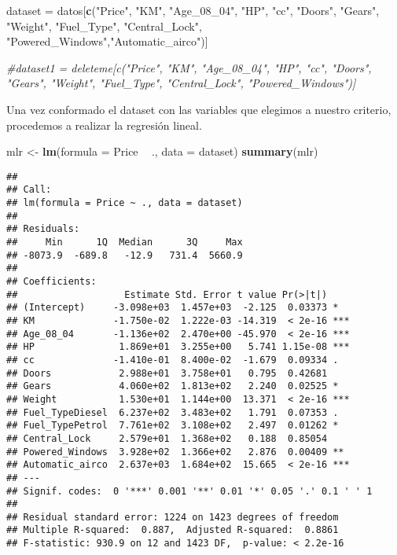\documentclass[
]{article}
\newenvironment{Shaded}{\begin{snugshade}}{\end{snugshade}}
\newcommand{\CommentTok}[1]{\textcolor[rgb]{0.56,0.35,0.01}{\textit{#1}}}
\newcommand{\DataTypeTok}[1]{\textcolor[rgb]{0.13,0.29,0.53}{#1}}
\newcommand{\KeywordTok}[1]{\textcolor[rgb]{0.13,0.29,0.53}{\textbf{#1}}}
\newcommand{\NormalTok}[1]{#1}
\newcommand{\OperatorTok}[1]{\textcolor[rgb]{0.81,0.36,0.00}{\textbf{#1}}}
\newcommand{\StringTok}[1]{\textcolor[rgb]{0.31,0.60,0.02}{#1}}
\begin{document}
\begin{Shaded}
\begin{Highlighting}[]
\NormalTok{dataset =}\StringTok{ }\NormalTok{datos[}\KeywordTok{c}\NormalTok{(}\StringTok{"Price"}\NormalTok{, }\StringTok{"KM"}\NormalTok{, }\StringTok{"Age_08_04"}\NormalTok{, }\StringTok{"HP"}\NormalTok{, }\StringTok{"cc"}\NormalTok{, }\StringTok{"Doors"}\NormalTok{, }\StringTok{"Gears"}\NormalTok{, }\StringTok{"Weight"}\NormalTok{,}
                  \StringTok{"Fuel_Type"}\NormalTok{, }\StringTok{"Central_Lock"}\NormalTok{, }\StringTok{"Powered_Windows"}\NormalTok{,}\StringTok{"Automatic_airco"}\NormalTok{)]}

\CommentTok{#dataset1 = deleteme[c("Price", "KM", "Age_08_04", "HP", "cc", "Doors", "Gears", "Weight", "Fuel_Type", "Central_Lock", "Powered_Windows")]}
\end{Highlighting}
\end{Shaded}

Una vez conformado el dataset con las variables que elegimos a nuestro
criterio, procedemos a realizar la regresión lineal.

\begin{Shaded}
\begin{Highlighting}[]
\NormalTok{mlr <-}\StringTok{ }\KeywordTok{lm}\NormalTok{(}\DataTypeTok{formula =}\NormalTok{ Price }\OperatorTok{~}\StringTok{ }\NormalTok{., }\DataTypeTok{data =}\NormalTok{ dataset)}
\KeywordTok{summary}\NormalTok{(mlr)}
\end{Highlighting}
\end{Shaded}

\begin{verbatim}
## 
## Call:
## lm(formula = Price ~ ., data = dataset)
## 
## Residuals:
##     Min      1Q  Median      3Q     Max 
## -8073.9  -689.8   -12.9   731.4  5660.9 
## 
## Coefficients:
##                   Estimate Std. Error t value Pr(>|t|)    
## (Intercept)     -3.098e+03  1.457e+03  -2.125  0.03373 *  
## KM              -1.750e-02  1.222e-03 -14.319  < 2e-16 ***
## Age_08_04       -1.136e+02  2.470e+00 -45.970  < 2e-16 ***
## HP               1.869e+01  3.255e+00   5.741 1.15e-08 ***
## cc              -1.410e-01  8.400e-02  -1.679  0.09334 .  
## Doors            2.988e+01  3.758e+01   0.795  0.42681    
## Gears            4.060e+02  1.813e+02   2.240  0.02525 *  
## Weight           1.530e+01  1.144e+00  13.371  < 2e-16 ***
## Fuel_TypeDiesel  6.237e+02  3.483e+02   1.791  0.07353 .  
## Fuel_TypePetrol  7.761e+02  3.108e+02   2.497  0.01262 *  
## Central_Lock     2.579e+01  1.368e+02   0.188  0.85054    
## Powered_Windows  3.928e+02  1.366e+02   2.876  0.00409 ** 
## Automatic_airco  2.637e+03  1.684e+02  15.665  < 2e-16 ***
## ---
## Signif. codes:  0 '***' 0.001 '**' 0.01 '*' 0.05 '.' 0.1 ' ' 1
## 
## Residual standard error: 1224 on 1423 degrees of freedom
## Multiple R-squared:  0.887,  Adjusted R-squared:  0.8861 
## F-statistic: 930.9 on 12 and 1423 DF,  p-value: < 2.2e-16
\end{verbatim}
\end{document}
